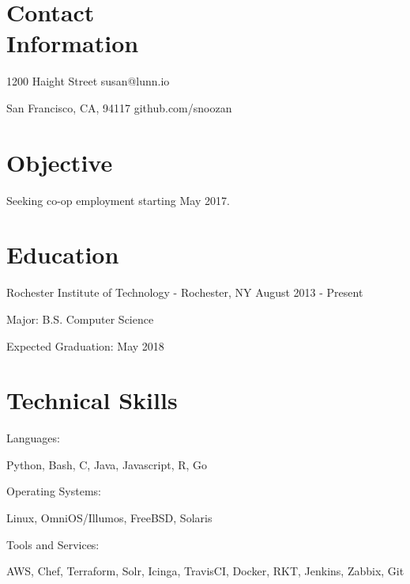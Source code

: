 \documentclass[a4paper,margin,line]{resume}
\newcommand{\rdate}[1]{\hfill {\small #1}}
\begin{document}
\begin{resume}
\section{\mysidestyle Contact \\ Information}
	\begin{asparablank}
		\item 1200 Haight Street \hfill susan@lunn.io
		\item San Francisco, CA, 94117 \hfill github.com/snoozan
	\end{asparablank}

\section{\mysidestyle Objective}
	\begin{asparablank}
    	\item Seeking co-op employment starting May 2017.
	\end{asparablank}
 
\section{\mysidestyle Education}
   \begin{compactdesc}
		   \item[Rochester Institute of Technology] - Rochester, NY \rdate{August 2013 - Present}
		   \begin{asparablank} { \small
				   \item Major: B.S. Computer Science
		   } \end{asparablank}
		   \begin{asparablank} { \small
				   \item Expected Graduation: May 2018
		   } \end{asparablank}
   \end{compactdesc}

\section{\mysidestyle Technical Skills}
	\begin{compactdesc}
		\item[Languages: ] \begin{asparablank} { \small
			\item Python, Bash, C, Java, Javascript, R, Go
		} \end{asparablank}
		\item[Operating Systems: ] \begin{asparablank} { \small
            \item Linux, OmniOS/Illumos, FreeBSD, Solaris
		} \end{asparablank}
		\item[Tools and Services: ] \begin{asparablank} { \small
            \item AWS, Chef, Terraform, Solr, Icinga, TravisCI, Docker, RKT, Jenkins, Zabbix, Git
		} \end{asparablank}
	\end{compactdesc}


\end{resume}
\end{document}
